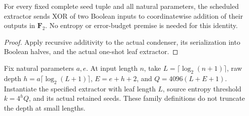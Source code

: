 \begin{theorem}
  \label{thm:lowerbounds-algebraic-scheduled-linearity}
  \leanok
  For every fixed complete seed tuple and all natural parameters, the
  scheduled extractor sends XOR of two Boolean inputs to coordinatewise
  addition of their outputs in $\mathbf F_2$. No entropy or error-budget
  premise is needed for this identity.
\end{theorem}
\begin{proof}
  \leanok
  Apply recursive additivity to the actual condenser, its serialization
  into Boolean halves, and the actual one-shot leaf extractor.
\end{proof}

\begin{definition}
  \label{def:lowerbounds-algebraic-polylog-extractor}
  \leanok
  Fix natural parameters $a,e$. At input length $n$, take
  $L=\lceil\log_2(n+1)\rceil$, raw depth
  $h=a\lceil\log_2(L+1)\rceil$, $E=e+h+2$, and
  $Q=4096(L+E+1)$. Instantiate the specified extractor with leaf length
  $L$, source entropy threshold $k=4^hQ$, and its actual retained seeds.
  These family definitions do not truncate the depth at small lengths.
\end{definition}

